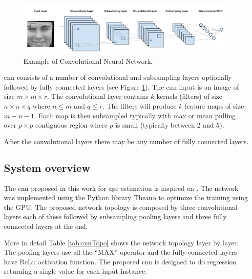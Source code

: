 \begin{figure}[!h]
	\centering
	\includegraphics[width=\textwidth]{figures/CNN_sample}
	\caption{Example of Convolutional Neural Network.}
	\label{fig:cnnSample}
\end{figure}

\gls{cnn} consists of a number of convolutional and subsampling layers optionally followed by fully connected layers (see Figure \ref{fig:cnnSample}). The \gls{cnn} input is an image of size $m\times m\times r$. The convolutional layer contains $k$ kernels (filters) of size $n\times n\times q$ where $n \leq m$ and $q \leq r$. The filters will produce $k$ feature maps of size $m - n - 1 $. Each map is then subsampled typically with max or mean pulling over $p\times p$ contiguous region where $p$ is small (typically between 2 and 5).

After the convolutional layers there may be any number of fully connected layers.

\subsection{System overview}

The \gls{cnn} proposed in this work for age estimation is inspired on \cite{yiage} \cite{yan2014}. The network was implemented using the Python library Theano \cite{Bastien-Theano-2012}\cite{bergstra+al:2010-scipy} to optimize the training using the GPU. The proposed network topology is composed by three convolutional layers each of these followed by subsampling pooling layers and three fully connected layers at the end.

More in detail Table \ref{tab:cnnTopo} shows the network topology layer by layer. The pooling layers use all the ``MAX'' operator and the fully-connected layers have ReLu \cite{conf/icml/NairH10} activation function. The proposed \gls{cnn} is designed to do regression returning a single value for each input instance.

